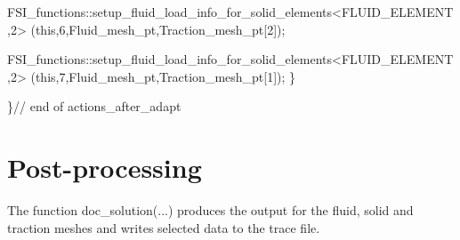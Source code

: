 \begin{DoxyCodeInclude}
   FSI\_functions::setup\_fluid\_load\_info\_for\_solid\_elements<FLUID\_ELEMENT,2>
    (\textcolor{keyword}{this},6,Fluid\_mesh\_pt,Traction\_mesh\_pt[2]); 
   
   FSI\_functions::setup\_fluid\_load\_info\_for\_solid\_elements<FLUID\_ELEMENT,2>
    (\textcolor{keyword}{this},7,Fluid\_mesh\_pt,Traction\_mesh\_pt[1]); 
  \}

 
\}\textcolor{comment}{// end of actions\_after\_adapt}

\end{DoxyCodeInclude}




 

\hypertarget{index_doc}{}\section{Post-\/processing}\label{index_doc}
The function {\ttfamily doc\+\_\+solution}(...) produces the output for the fluid, solid and traction meshes and writes selected data to the trace file.


